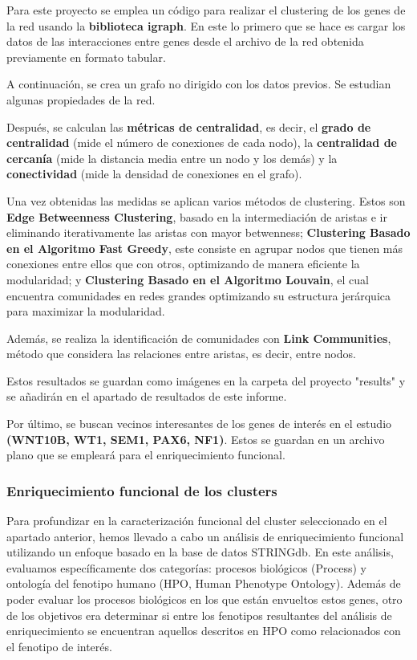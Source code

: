 Para este proyecto se emplea un código para realizar el clustering de los genes de la red usando la \textbf{biblioteca igraph}. En este lo primero que se hace es cargar los datos de las interacciones entre genes desde el archivo de la red obtenida previamente en formato tabular.

A continuación, se crea un grafo no dirigido con los datos previos. Se estudian algunas propiedades de la red.

Después, se calculan las \textbf{métricas de centralidad}, es decir, el \textbf{grado de centralidad} (mide el número de conexiones de cada nodo), la \textbf{centralidad de cercanía} (mide la distancia media entre un nodo y los demás) y la \textbf{conectividad} (mide la densidad de conexiones en el grafo).

Una vez obtenidas las medidas se aplican varios métodos de clustering. Estos son \textbf{Edge Betweenness Clustering}, basado en la intermediación de aristas e ir eliminando iterativamente las aristas con mayor betwenness; \textbf{Clustering Basado en el Algoritmo Fast Greedy}, este consiste en agrupar nodos que tienen más conexiones entre ellos que con otros, optimizando de manera eficiente la modularidad; y \textbf{Clustering Basado en el Algoritmo Louvain}, el cual encuentra comunidades en redes grandes optimizando su estructura jerárquica para maximizar la modularidad.

Además, se realiza la identificación de comunidades con \textbf{Link Communities}, método que considera las relaciones entre aristas, es decir, entre nodos.

Estos resultados se guardan como imágenes en la carpeta del proyecto "results" y se añadirán en el apartado de resultados de este informe.

Por último, se buscan vecinos interesantes de los genes de interés en el estudio \textbf{(WNT10B, WT1, SEM1, PAX6, NF1)}. Estos se guardan en un archivo plano que se empleará para el enriquecimiento funcional.

\subsubsection{Enriquecimiento funcional de los clusters}


Para profundizar en la caracterización funcional del cluster seleccionado en el apartado anterior, hemos llevado a cabo un análisis de enriquecimiento funcional utilizando un enfoque basado en la base de datos STRINGdb. En este análisis, evaluamos específicamente dos categorías: procesos biológicos (Process) y ontología del fenotipo humano (HPO, Human Phenotype Ontology). Además de poder evaluar los procesos biológicos en los que están envueltos estos genes, otro de los objetivos era determinar si entre los fenotipos resultantes del análisis de enriquecimiento se encuentran aquellos descritos en HPO como relacionados con el fenotipo de interés.

